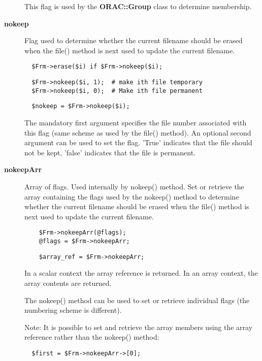 \begin{description}
This flag is used by the \textbf{ORAC::Group} class to determine
membership.

\item[\textbf{nokeep}] \mbox{}

Flag used to determine whether the current filename should be
erased when the file() method is next used to update the current
filename.

\begin{verbatim}
  $Frm->erase($i) if $Frm->nokeep($i);
\end{verbatim}
\begin{verbatim}
  $Frm->nokeep($i, 1);  # make ith file temporary
  $Frm->nokeep($i, 0);  # Make ith file permanent
\end{verbatim}
\begin{verbatim}
  $nokeep = $Frm->nokeep($i);
\end{verbatim}


The mandatory first argument specifies the file number associated with
this flag (same scheme as used by the file() method). An optional
second argument can be used to set the flag. 'True' indicates that the
file should not be kept, 'false' indicates that the file is permanent.

\item[\textbf{nokeepArr}] \mbox{}

Array of flags. Used internally by nokeep() method.  Set or retrieve
the array containing the flags used by the nokeep() method to
determine whether the current filename should be erased when the
file() method is next used to update the current filename.

\begin{verbatim}
    $Frm->nokeepArr(@flags);
    @flags = $Frm->nokeepArr;
\end{verbatim}
\begin{verbatim}
    $array_ref = $Frm->nokeepArr;
\end{verbatim}


In a scalar context the array reference is returned.
In an array context, the array contents are returned.



The nokeep() method can be used to set or retrieve individual
flags (the numbering scheme is different).



Note: It is possible to set and retrieve the array members using
the array reference rather than the nokeep() method:

\begin{verbatim}
  $first = $Frm->nokeepArr->[0];
\end{verbatim}



\end{description}

